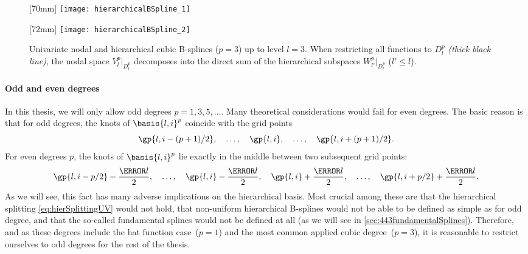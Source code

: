 \begin{figure}
  [70mm]{%
    \texttt{[image: hierarchicalBSpline\_1]}%
  }%
  \hfill%
  \hfill%
  [72mm]{%
    \texttt{[image: hierarchicalBSpline\_2]}%
  }%
  \caption{%
    Univariate nodal and hierarchical cubic B-splines ($p = 3$)
    up to level $l = 3$.
    When restricting all functions to $D_l^p$ \emph{(thick black line)},
    the nodal space $V_l^p|_{D_l^p}$ decomposes into the direct sum
    of the hierarchical subspaces $W_{l'}^p|_{D_l^p}$ ($l' \le l$).%
  }
  \label{fig:hierarchicalBSpline}
\end{figure}

\paragraph{Odd and even degrees}

In this thesis, we will only allow odd degrees $p = 1, 3, 5, \dotsc$.
Many theoretical considerations would fail for even degrees.
The basic reason is that for odd degrees, the knots of
$\basis{l,i}^p$ coincide with the grid points \cite{Valentin14Hierarchische}
\begin{equation}
  \gp{l,i-(p+1)/2},\quad
  \dotsc,\quad
  \gp{l,i},\quad
  \dotsc,\quad
  \gp{l,i+(p+1)/2}.
\end{equation}
For even degrees $p$, the knots of $\basis{l,i}^p$ lie exactly in
the middle between two subsequent grid points:
\begin{equation}
  \gp{l,i-p/2} - \frac{\ms{l}}{2},\quad
  \dotsc,\quad
  \gp{l,i} - \frac{\ms{l}}{2},\quad
  \gp{l,i} + \frac{\ms{l}}{2},\quad
  \dotsc,\quad
  \gp{l,i+p/2} + \frac{\ms{l}}{2}.
\end{equation}
As we will see,
this fact has many adverse implications on the hierarchical basis.
Most crucial among these are
that the hierarchical splitting \eqref{eq:hierSplittingUV} would not hold,
that non-uniform hierarchical B-splines would not be able to be defined as
simple as for odd degree, and
that the so-called fundamental splines would not be defined at all
(as we will see in \cref{sec:443fundamentalSplines}).
Therefore, and
as these degrees include the hat function case~($p = 1$) and the
most common applied cubic degree~($p = 3$),
it is reasonable to restrict ourselves to odd degrees
for the rest of the thesis.



